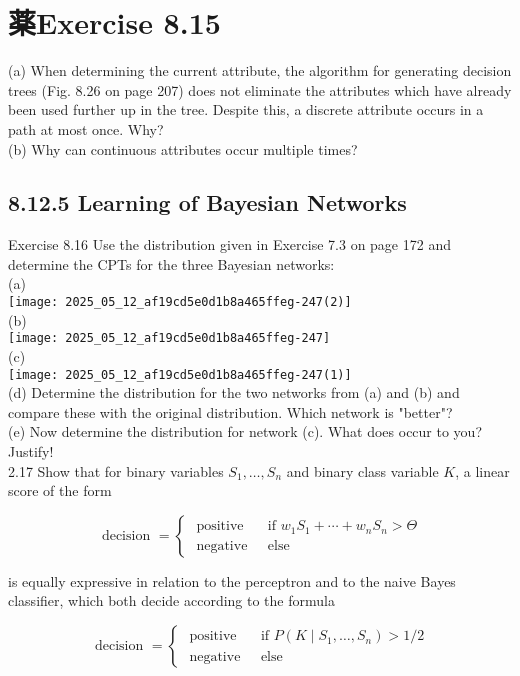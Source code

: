 \documentclass[10pt]{article}
\begin{document}
\section*{薬Exercise 8.15}
(a) When determining the current attribute, the algorithm for generating decision trees (Fig. 8.26 on page 207) does not eliminate the attributes which have already been used further up in the tree. Despite this, a discrete attribute occurs in a path at most once. Why?\\
(b) Why can continuous attributes occur multiple times?

\subsection*{8.12.5 Learning of Bayesian Networks}
Exercise 8.16 Use the distribution given in Exercise 7.3 on page 172 and determine the CPTs for the three Bayesian networks:\\
(a)\\
\texttt{[image: 2025\_05\_12\_af19cd5e0d1b8a465ffeg-247(2)]}\\
(b)\\
\texttt{[image: 2025\_05\_12\_af19cd5e0d1b8a465ffeg-247]}\\
(c)\\
\texttt{[image: 2025\_05\_12\_af19cd5e0d1b8a465ffeg-247(1)]}\\
(d) Determine the distribution for the two networks from (a) and (b) and compare these with the original distribution. Which network is "better"?\\
(e) Now determine the distribution for network (c). What does occur to you? Justify!\\
2.17 Show that for binary variables $S_{1}, \ldots, S_{n}$ and binary class variable $K$, a linear score of the form

$$
\text { decision }= \begin{cases}\text { positive } & \text { if } w_{1} S_{1}+\cdots+w_{n} S_{n}>\Theta \\ \text { negative } & \text { else }\end{cases}
$$

is equally expressive in relation to the perceptron and to the naive Bayes classifier, which both decide according to the formula

$$
\text { decision }= \begin{cases}\text { positive } & \text { if } P\left(K \mid S_{1}, \ldots, S_{n}\right)>1 / 2 \\ \text { negative } & \text { else }\end{cases}
$$
\end{document}
